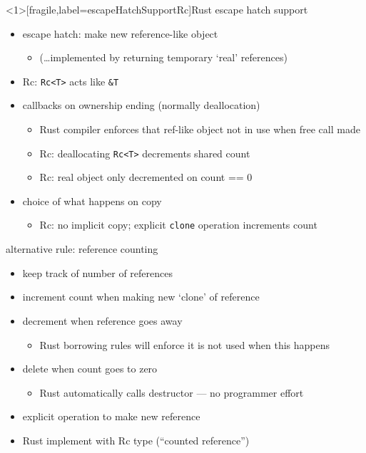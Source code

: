 \begin{frame}<1>[fragile,label=escapeHatchSupportRc]{Rust escape hatch support}
    \begin{itemize}
        \item escape hatch: make new reference-like object
            \begin{itemize}
            \item (\ldots implemented by returning temporary `real' references)
            \end{itemize}
        \item<2> Rc: \verb|Rc<T>| acts like \verb|&T|
        \item callbacks on ownership ending (normally deallocation)
            \begin{itemize}
            \item Rust compiler enforces that ref-like object not in use when free call made
            \item<2> Rc: deallocating \verb|Rc<T>| decrements shared count
            \item<2> Rc: real object only decremented on count == 0
            \end{itemize}
        \item choice of what happens on copy
            \begin{itemize}
            \item<2> Rc: no implicit copy; explicit \verb|clone| operation increments count
            \end{itemize}
    \end{itemize}
\end{frame}
 
\begin{frame}[fragile,label=refCounting]{alternative rule: reference counting}
    \begin{itemize}
    \item keep track of number of references
    \item increment count when making new `clone' of reference
    \item decrement when reference goes away
        \begin{itemize}
        \item Rust borrowing rules will enforce it is not used when this happens
        \end{itemize}
    \item delete when count goes to zero
        \begin{itemize}
        \item Rust automatically calls destructor --- no programmer effort
        \end{itemize}
    \item explicit operation to make new reference
    \item Rust implement with Rc type (``counted reference'')
    \end{itemize}
\end{frame}

